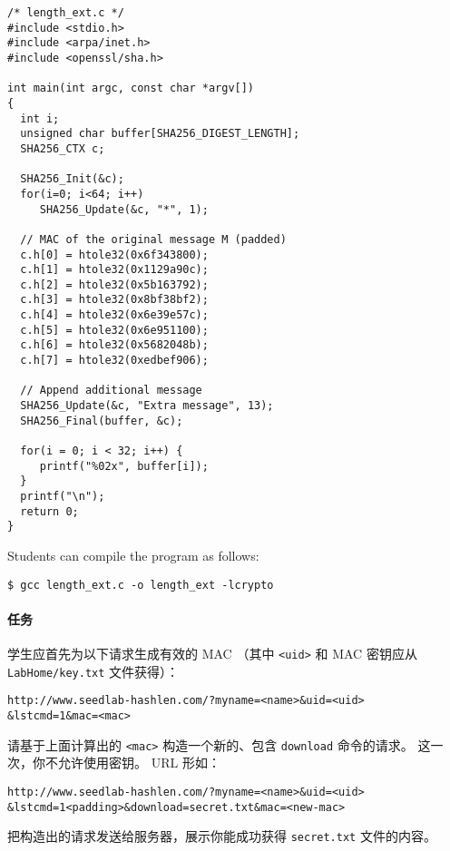 \begin{lstlisting}[escapechar=|]
/* length_ext.c */
#include <stdio.h>
#include <arpa/inet.h>
#include <openssl/sha.h>

int main(int argc, const char *argv[])
{
  int i;
  unsigned char buffer[SHA256_DIGEST_LENGTH];
  SHA256_CTX c;

  SHA256_Init(&c);
  for(i=0; i<64; i++)
     SHA256_Update(&c, "*", 1);

  // MAC of the original message M (padded)
  c.h[0] = htole32(0x6f343800);
  c.h[1] = htole32(0x1129a90c);
  c.h[2] = htole32(0x5b163792);
  c.h[3] = htole32(0x8bf38bf2);
  c.h[4] = htole32(0x6e39e57c);
  c.h[5] = htole32(0x6e951100);
  c.h[6] = htole32(0x5682048b);
  c.h[7] = htole32(0xedbef906);

  // Append additional message
  SHA256_Update(&c, "Extra message", 13);
  SHA256_Final(buffer, &c);

  for(i = 0; i < 32; i++) {
     printf("%02x", buffer[i]);
  }
  printf("\n");
  return 0;
}
\end{lstlisting}

Students can compile the program as follows:

\begin{lstlisting}
$ gcc length_ext.c -o length_ext -lcrypto
\end{lstlisting}

\paragraph{任务}
学生应首先为以下请求生成有效的 MAC
（其中 \texttt{<uid>} 和 MAC 密钥应从 \texttt{LabHome/key.txt} 文件获得）：

\begin{lstlisting}
http://www.seedlab-hashlen.com/?myname=<name>&uid=<uid>
&lstcmd=1&mac=<mac>
\end{lstlisting}

请基于上面计算出的 \texttt{<mac>} 构造一个新的、包含 \texttt{download} 命令的请求。
这一次，你不允许使用密钥。
URL 形如：

\begin{lstlisting}
http://www.seedlab-hashlen.com/?myname=<name>&uid=<uid>
&lstcmd=1<padding>&download=secret.txt&mac=<new-mac>
\end{lstlisting}

把构造出的请求发送给服务器，展示你能成功获得 \texttt{secret.txt} 文件的内容。



